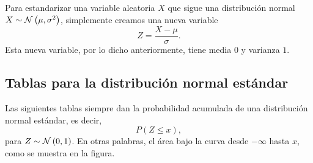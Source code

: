 \formal
Para estandarizar una variable aleatoria \(X\) que sigue una distribución normal \(X\sim\operatorname{\mathcal{N}}\left( \mu, \sigma^2 \right)\), simplemente creamos una nueva variable \[Z = \frac{X-\mu}{\sigma}.\] Esta nueva variable, por lo dicho anteriormente, tiene media \(0\) y varianza \(1\).
\informal

\subsection{Tablas para la distribución normal estándar}

Las siguientes tablas siempre dan la probabilidad acumulada de una distribución normal estándar, es decir, \[P(Z \leq x),\] para \(Z \sim \operatorname{\mathcal{N}}\left( 0, 1 \right)\). En otras palabras, el área bajo la curva desde \(-\infty\) hasta \(x\), como se muestra en la figura.

\begin{center}
\end{center}


